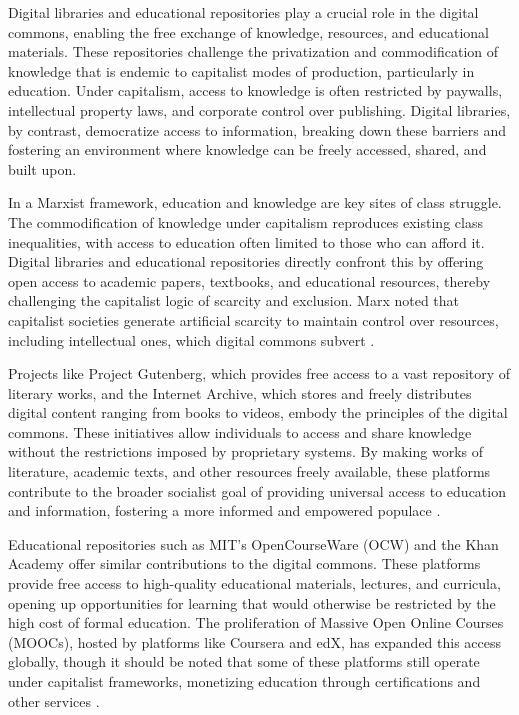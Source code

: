 \begin{refsection}
Digital libraries and educational repositories play a crucial role in the digital commons, enabling the free exchange of knowledge, resources, and educational materials. These repositories challenge the privatization and commodification of knowledge that is endemic to capitalist modes of production, particularly in education. Under capitalism, access to knowledge is often restricted by paywalls, intellectual property laws, and corporate control over publishing. Digital libraries, by contrast, democratize access to information, breaking down these barriers and fostering an environment where knowledge can be freely accessed, shared, and built upon.

In a Marxist framework, education and knowledge are key sites of class struggle. The commodification of knowledge under capitalism reproduces existing class inequalities, with access to education often limited to those who can afford it. Digital libraries and educational repositories directly confront this by offering open access to academic papers, textbooks, and educational resources, thereby challenging the capitalist logic of scarcity and exclusion. Marx noted that capitalist societies generate artificial scarcity to maintain control over resources, including intellectual ones, which digital commons subvert \cite[pp.~786-788]{marx2008}.

Projects like Project Gutenberg, which provides free access to a vast repository of literary works, and the Internet Archive, which stores and freely distributes digital content ranging from books to videos, embody the principles of the digital commons. These initiatives allow individuals to access and share knowledge without the restrictions imposed by proprietary systems. By making works of literature, academic texts, and other resources freely available, these platforms contribute to the broader socialist goal of providing universal access to education and information, fostering a more informed and empowered populace \cite[pp.~82-83]{kelty2008}.

Educational repositories such as MIT’s OpenCourseWare (OCW) and the Khan Academy offer similar contributions to the digital commons. These platforms provide free access to high-quality educational materials, lectures, and curricula, opening up opportunities for learning that would otherwise be restricted by the high cost of formal education. The proliferation of Massive Open Online Courses (MOOCs), hosted by platforms like Coursera and edX, has expanded this access globally, though it should be noted that some of these platforms still operate under capitalist frameworks, monetizing education through certifications and other services \cite[pp.~112-113]{peters2010}.


\end{refsection}
